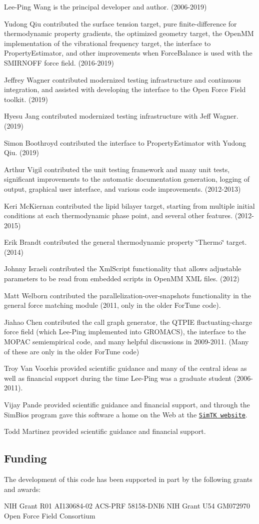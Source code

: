 \begin{DoxyItemize}
\item Lee-\/\+Ping Wang is the principal developer and author. (2006-\/2019)
\item Yudong Qiu contributed the surface tension target, pure finite-\/difference for thermodynamic property gradients, the optimized geometry target, the Open\+MM implementation of the vibrational frequency target, the interface to Property\+Estimator, and other improvements when Force\+Balance is used with the S\+M\+I\+R\+N\+O\+FF force field. (2016-\/2019)
\item Jeffrey Wagner contributed modernized testing infrastructure and continuous integration, and assisted with developing the interface to the Open Force Field toolkit. (2019)
\item Hyesu Jang contributed modernized testing infrastructure with Jeff Wagner. (2019)
\item Simon Boothroyd contributed the interface to Property\+Estimator with Yudong Qiu. (2019)
\item Arthur Vigil contributed the unit testing framework and many unit tests, significant improvements to the automatic documentation generation, logging of output, graphical user interface, and various code improvements. (2012-\/2013)
\item Keri Mc\+Kiernan contributed the lipid bilayer target, starting from multiple initial conditions at each thermodynamic phase point, and several other features. (2012-\/2015)
\item Erik Brandt contributed the general thermodynamic property \char`\"{}\+Thermo\char`\"{} target. (2014)
\item Johnny Israeli contributed the Xml\+Script functionality that allows adjustable parameters to be read from embedded scripts in Open\+MM X\+ML files. (2012)
\item Matt Welborn contributed the parallelization-\/over-\/snapshots functionality in the general force matching module (2011, only in the older For\+Tune code).
\item Jiahao Chen contributed the call graph generator, the Q\+T\+P\+IE fluctuating-\/charge force field (which Lee-\/\+Ping implemented into G\+R\+O\+M\+A\+CS), the interface to the M\+O\+P\+AC semiempirical code, and many helpful discussions in 2009-\/2011. (Many of these are only in the older For\+Tune code)
\item Troy Van Voorhis provided scientific guidance and many of the central ideas as well as financial support during the time Lee-\/\+Ping was a graduate student (2006-\/2011).
\item Vijay Pande provided scientific guidance and financial support, and through the Sim\+Bios program gave this software a home on the Web at the \href{https://simtk.org/home/forcebalance/}{\tt Sim\+TK website}.
\item Todd Martinez provided scientific guidance and financial support.
\end{DoxyItemize}\hypertarget{index_funding}{}\subsection{Funding}\label{index_funding}
The development of this code has been supported in part by the following grants and awards\+:

N\+IH Grant R01 A\+I130684-\/02 A\+C\+S-\/\+P\+RF 58158-\/\+D\+N\+I6 N\+IH Grant U54 G\+M072970 Open Force Field Consortium 